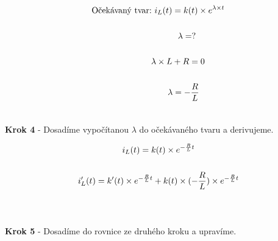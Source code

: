 \begin{gather*}
\text{Očekávaný tvar:}\ i_L(t) = k(t) \times e^{\lambda \times t} \\\\
\newline
\newline
\lambda = ? \\\\
\newline
\newline
\lambda \times L + R = 0\\\\
\newline
\newline
\lambda = -\frac{R}{L}\\\\
\end{gather*}

\begin{center}
\textbf{Krok 4} - Dosadíme vypočítanou $\lambda$ do očekávaného tvaru a derivujeme. \\
\end{center}
\vspace{-0.5cm}

\begin{gather*}
i_L(t) = k(t) \times e^{-\frac{R}{L}t} \\\\
\newline
\newline
i'_L(t) = k'(t) \times e^{-\frac{R}{L}t} + k(t) \times (-\frac{R}{L}) \times e^{-\frac{R}{L}t} \\\\
\newline
\newline
\end{gather*}


\begin{center}
\textbf{Krok 5} - Dosadíme do rovnice ze druhého kroku a upravíme. \\
\end{center}
\vspace{-0.5cm}

